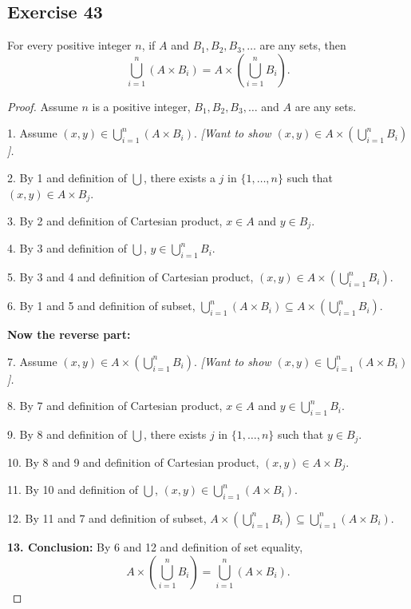 \documentclass[14pt]{extarticle}
\newcommand{\dps}{\displaystyle}
\begin{document}
\subsection{Exercise 43}
For every positive integer $n$, if $A$ and \(B_1, B_2, B_3, \ldots\) are any sets, then
\[
\bigcup_{i=1}^n (A \times B_i) = A \times \left( \bigcup_{i=1}^n B_i\right).
\]
\begin{proof}
Assume $n$ is a positive integer, \(B_1, B_2, B_3, \ldots\) and $A$ are any sets.

1. Assume \(\dps (x,y) \in \bigcup_{i=1}^n (A \times B_i)\). {\it [Want to show \(\dps (x,y) \in A \times \left( 
\bigcup_{i=1}^n B_i\right)\)].}

2. By 1 and definition of \(\dps \bigcup\), there exists a $j$ in \(\{1, \ldots, n\}\) such that \((x,y) \in A \times B_j\).

3. By 2 and definition of Cartesian product, \(x \in A\) and \(y \in B_j\).

4. By 3 and definition of $\dps \bigcup$, \(\dps y \in \bigcup_{i=1}^n B_i\).

5. By 3 and 4 and definition of Cartesian product, \(\dps (x,y) \in A \times \left(\bigcup_{i=1}^n B_i\right)\).

6. By 1 and 5 and definition of subset, \(\dps \bigcup_ {i=1}^n (A \times B_i) \subseteq A \times \left(
\bigcup_{i=1}^n B_i\right).\)

{\bf Now the reverse part:}

7. Assume \(\dps (x,y) \in A \times \left(\bigcup_{i=1}^n B_i\right)\). 
{\it [Want to show \(\dps (x,y) \in \bigcup_{i=1}^n (A \times B_i)\)].}

8. By 7 and definition of Cartesian product, \(x \in A \) and \(\dps y \in \bigcup_{i=1}^n B_i\).

9. By 8 and definition of $\dps \bigcup$, there exists $j$ in \(\{1, \ldots, n\}\) such that \(y \in B_j\).

10. By 8 and 9 and definition of Cartesian product, \((x,y) \in A \times B_j\).

11. By 10 and definition of $\dps \bigcup$, \((x, y) \in \dps \bigcup_{i=1}^n (A \times B_i)\).

12. By 11 and 7 and definition of subset, \(\dps A \times \left(\bigcup_{i=1}^n B_i\right) \subseteq \bigcup_{i=1}^n (A \times B_i)\).

{\bf 13. Conclusion:} By 6 and 12 and definition of set equality,
\[
A \times \left(\bigcup_{i=1}^n B_i\right) = \bigcup_{i=1}^n (A \times B_i).
\]
\end{proof}
\end{document}
